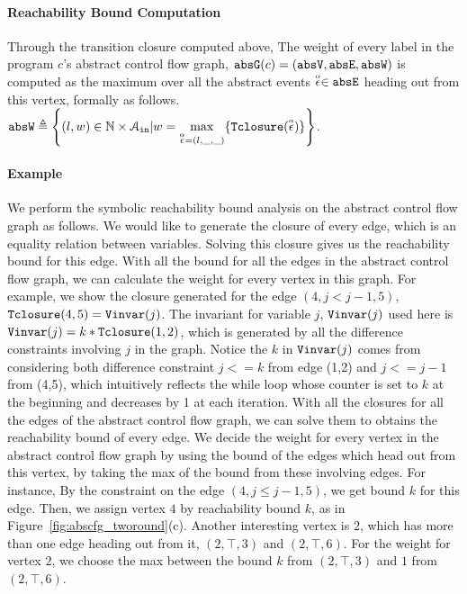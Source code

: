 \paragraph*{Reachability Bound Computation}
Through the transition closure computed above, 
The weight of every label in 
the program $c$'s abstract control flow graph,
$\mathtt{abs}{\mathtt{G}}(c) =(\mathtt{abs}{\mathtt{V}}, \mathtt{abs}{\mathtt{E}}, \mathtt{abs}{\mathtt{W}})$
is 
computed as the maximum over all the abstract events $\stackrel{\scriptscriptstyle{\alpha}}{\mathtt{\epsilon}{}} \in \mathtt{abs}{\mathtt{E}}$ heading out from this vertex, formally as follows.
\\
$\absW 
\triangleq \left\{ (l, w) \in \mathbb{N} \times \mathcal{A}_{\lin} | 
w = \max\limits_{\absevent = (l, \_, \_)} \{ \absclr(\absevent)\} \right\}$.
\paragraph*{Example}
We perform the symbolic reachability bound analysis on the abstract control flow graph as follows. 
We would like to generate the closure of every edge, which is an equality relation between variables.  Solving this closure gives us the reachability bound for this edge. With all the bound for all the edges in the abstract control flow graph, we can calculate the weight for every vertex in this graph. For example, we show the closure generated for the edge 
$(4, j < j - 1, 5)$, 
${\mathtt{Tclosure}}(4, 5) = {\mathtt{Vinvar}}(j)$. The invariant for variable $j$, ${\mathtt{Vinvar}}(j)$ used here is 
${\mathtt{Vinvar}}(j) = k * {\mathtt{Tclosure}}(1, 2)$, which is generated by all the difference constraints involving $j$ in the graph. Notice the $k$ in ${\mathtt{Vinvar}}(j)$ comes from considering both difference constraint $j<=k$ from edge (1,2) and $j<=j-1$ from (4,5), which intuitively reflects the while loop whose counter is set to $k$ at the beginning and decreases by 1 at each iteration. 
With all the closures for all the edges of the abstract control flow graph, we can solve them to obtains the reachability bound of every edge. We decide the weight for every vertex in the abstract control flow graph by using the bound of the edges which head out from this vertex, by taking the max of the bound from these involving edges. For instance,   
By the constraint on the edge $(4, j \leq j - 1, 5)$, we get bound $k$ for this edge.
Then, we assign vertex $4$ by reachability bound $k$, as in Figure~\ref{fig:abscfg_tworound}(c). 
Another interesting vertex is $2$, which has more than one edge heading out from it, $(2, \top, 3)$ and $(2,\top, 6)$. For the weight for vertex $2$, we choose the max between the bound $k$ from $(2,\top, 3)$ and $1$ from $(2,\top, 6)$.
